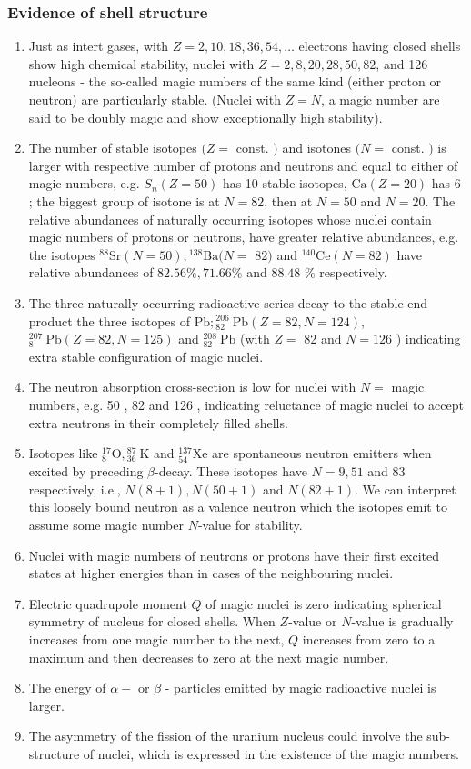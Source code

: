\subsubsection{Evidence of shell structure}
\begin{enumerate}
	\item Just as intert gases, with $Z=2,10,18,36,54, \ldots$ electrons having closed shells show high chemical stability, nuclei with $Z=2,8,20,28,50,82$, and 126 nucleons - the so-called magic numbers of the same kind (either proton or neutron) are particularly stable. (Nuclei with $Z=N$, a magic number are said to be doubly magic and show exceptionally high stability).
	\item The number of stable isotopes $(Z=$ const. $)$ and isotones $(N=$ const. $)$ is larger with respective number of protons and neutrons and equal to either of magic numbers, e.g. $S_{n}(Z=50)$ has 10 stable isotopes, $\mathrm{Ca}(Z=20)$ has 6 ; the biggest group of isotone is at $N=82$, then at $N=50$ and $N=20$. The relative abundances of naturally occurring isotopes whose nuclei contain magic numbers of protons or neutrons, have greater relative abundances, e.g. the isotopes ${ }^{88} \mathrm{Sr}(N=50),{ }^{138} \mathrm{Ba}(N=$ $82)$ and ${ }^{140} \mathrm{Ce}(N=82)$ have relative abundances of $82.56 \%, 71.66 \%$ and $88.48$ \% respectively.
	\item The three naturally occurring radioactive series decay to the stable end product the three isotopes of $\mathrm{Pb} ;{ }_{82}^{206} \mathrm{~Pb}(Z=82, N=124)$, ${ }_{8}^{207} \mathrm{~Pb}(Z=82, N=125)$ and ${ }_{82}^{208} \mathrm{~Pb}$ (with $Z=$ 82 and $N=126$ ) indicating extra stable configuration of magic nuclei.
	\item The neutron absorption cross-section is low for nuclei with $N=$ magic numbers, e.g. 50 , 82 and 126 , indicating reluctance of magic nuclei to accept extra neutrons in their completely filled shells.
	\item Isotopes like ${ }_{8}^{17} \mathrm{O},{ }_{36}^{87} \mathrm{~K}$ and ${ }_{54}^{137} \mathrm{Xe}$ are spontaneous neutron emitters when excited by preceding $\beta$-decay. These isotopes have $N=9,51$ and 83 respectively, i.e., $N(8+1), N(50+1)$ and $N(82+1)$. We can interpret this loosely bound neutron as a valence neutron which the isotopes emit to assume some magic number $N$-value for stability.
	\item Nuclei with magic numbers of neutrons or protons have their first excited states at higher energies than in cases of the neighbouring nuclei.
	\item Electric quadrupole moment $Q$ of magic nuclei is zero indicating spherical symmetry of nucleus for closed shells. When $Z$-value or $N$-value is gradually increases from one magic number to the next, $Q$ increases from zero to a maximum and then decreases to zero at the next magic number.
	\item The energy of $\alpha-$ or $\beta$ - particles emitted by magic radioactive nuclei is larger.
	\item The asymmetry of the fission of the uranium nucleus could involve the sub-structure of nuclei, which is expressed in the existence of the magic numbers.
\end{enumerate}
